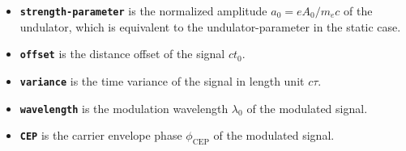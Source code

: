\begin{enumerate}
\begin{itemize}
	\item \textbf{\texttt{strength-parameter}} is the normalized amplitude $a_0 = e A_0 / m_ec $ of the undulator, which is equivalent to the undulator-parameter in the static case.
	\item \textbf{\texttt{offset}} is the distance offset of the signal $ct_0$.
	\item \textbf{\texttt{variance}} is the time variance of the signal in length unit $c\tau$.
	\item \textbf{\texttt{wavelength}} is the modulation wavelength $\lambda_0$ of the modulated signal.
	\item \textbf{\texttt{CEP}} is the carrier envelope phase $\phi_{\mathrm{CEP}}$ of the modulated signal.
\end{itemize}
\end{enumerate}

